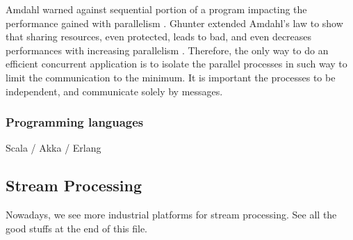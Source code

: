 Amdahl warned against sequential portion of a program impacting the performance gained with parallelism \cite{Amdahl1967}.
Ghunter extended Amdahl's law to show that sharing resources, even protected, leads to bad, and even decreases performances with increasing parallelism \cite{Gustafson1988,Gunther1993,Gunther1996,Nelson1996,Gunther2002}.
Therefore, the only way to do an efficient concurrent application is to isolate the parallel processes in such way to limit the communication to the minimum.
It is important the processes to be independent, and communicate solely by messages.

\subsubsection{Programming languages}

Scala / Akka / Erlang




\subsection{Stream Processing} \label{chapter3:parallel-execution:stream-processing}

Nowadays, we see more industrial platforms for stream processing.
See all the good stuffs at the end of this file.










\endinput



TODO read Communication and Concurrency by Milner 1989
And A theory of synchrony and asynchrony by He 1990

\nt{We need to talk about state synchronization outside of message-passing.}


\subsection{Programming models}

\subsubsection{Distributed Processes}

Distributed processes: a concurrent programming concept \cite{Hansen1978}
This paper defines real-time applications.
It proposes a unification between monitor and processes to apply on distributed storage.
The distributed processes are basically event-loops with cooperative scheduling.
However, the communication is done via procedure calling, not message-passing.
A process defines common procedures, callable by other processes.
Processes have access to guarded commands, and guarded regions.
A guarded region (cycle, when) can make the execution wait, the guarded command (if, do) not.
(That is how is )

